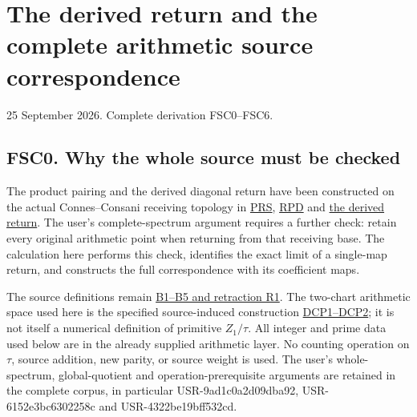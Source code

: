 \section{The derived return and the complete arithmetic source
correspondence}\label{the-derived-return-and-the-complete-arithmetic-source-correspondence}

25 September 2026. Complete derivation FSC0--FSC6.

\subsection{FSC0. Why the whole source must be
checked}\label{fsc0.-why-the-whole-source-must-be-checked}

The product pairing and the derived diagonal return have been
constructed on the actual Connes--Consani receiving topology in
\href{https://github.com/KokunoYumeto/zeta-function-research-reader/blob/main/workbenches/splitzero-tandem/continuations/20260925-full-source-tensor-and-original-divisor/counterfactual/ORIGINAL_RESIDUE_PRODUCT_SHEAF_PAIRING.md}{PRS},
\href{https://github.com/KokunoYumeto/zeta-function-research-reader/blob/main/workbenches/splitzero-tandem/continuations/20260925-full-source-tensor-and-original-divisor/counterfactual/RESIDUE_PRODUCT_DIAGONAL_INDEPENDENT.md}{RPD}
and
\href{https://github.com/KokunoYumeto/zeta-function-research-reader/blob/main/workbenches/splitzero-tandem/continuations/20260925-full-source-tensor-and-original-divisor/counterfactual/DIAGONAL_EXTRAORDINARY_RETURN.md}{the
derived return}. The user's complete-spectrum argument requires a
further check: retain every original arithmetic point when returning
from that receiving base. The calculation here performs this check,
identifies the exact limit of a single-map return, and constructs the
full correspondence with its coefficient maps.

The source definitions remain
\href{https://github.com/KokunoYumeto/zeta-function-research-reader/blob/36a82ecca98addb8a98b48204e349737856c7223/workbenches/splitzero-tandem/continuations/20260924-cohomology-weight-and-character-lifts/original-character-lifting/foundations/user_definitions_20260924/SOURCE_OPERATIONS_AND_PROOFS.md}{B1--B5
and retraction R1}. The two-chart arithmetic space used here is the
specified source-induced construction
\href{https://github.com/KokunoYumeto/zeta-function-research-reader/blob/36a82ecca98addb8a98b48204e349737856c7223/workbenches/splitzero-tandem/continuations/20260924-cohomology-weight-and-character-lifts/original-character-lifting/tau_lifting_weights_20260924/SOURCE_CC_DOUBLE_PULLBACK.md}{DCP1--DCP2};
it is not itself a numerical definition of primitive \(Z_1/\tau\). All
integer and prime data used below are in the already supplied arithmetic
layer. No counting operation on \(\tau\), source addition, new parity,
or source weight is used. The user's whole-spectrum, global-quotient and
operation-prerequisite arguments are retained in the complete corpus, in
particular USR-9ad1c0a2d09dba92, USR-6152e3bc6302258c and
USR-4322be19bff532cd.

